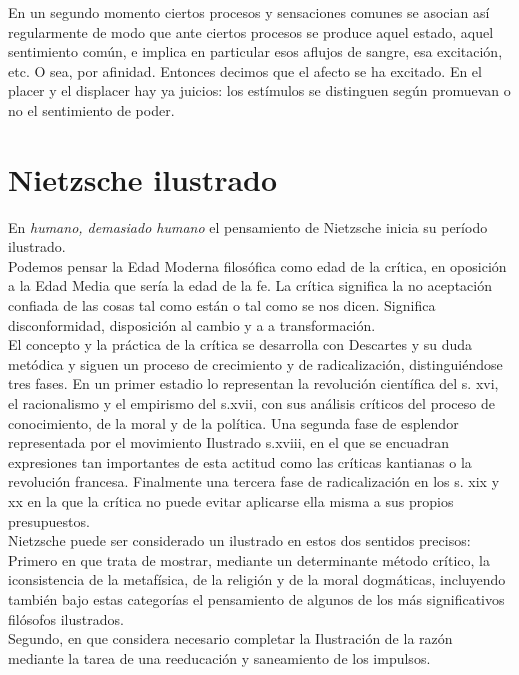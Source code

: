 \documentclass[a4paper, 10pt, twocolumn, spanish]{article}
\begin{document}
En un segundo momento ciertos procesos y sensaciones comunes se
asocian así regularmente de modo que ante ciertos procesos se produce
aquel estado, aquel sentimiento común, e implica en particular esos
aflujos de sangre, esa excitación, etc. O sea, por afinidad. Entonces
decimos que el afecto se ha excitado. En el placer y el displacer hay
ya juicios: los estímulos se distinguen según promuevan o no el
sentimiento de poder.

\section{Nietzsche ilustrado}
\label{sec:org2d4f695}
En \emph{humano, demasiado humano} el pensamiento de Nietzsche inicia su
período ilustrado.\\[0pt]

Podemos pensar la Edad Moderna filosófica como edad de la crítica, en
oposición a la Edad Media que sería la edad de la fe. La crítica
significa la no aceptación confiada de las cosas tal como están o tal
como se nos dicen. Significa disconformidad, disposición al cambio y a
a transformación.\\[0pt]

El concepto y la práctica de la crítica se desarrolla con Descartes y
su duda metódica y siguen un proceso de crecimiento y de
radicalización, distinguiéndose tres fases. En un primer estadio lo
representan la revolución científica del s. xvi, el racionalismo y el
empirismo del s.xvii, con sus análisis críticos del proceso de
conocimiento, de la moral y de la política. Una segunda fase de
esplendor representada por el movimiento Ilustrado s.xviii, en el que
se encuadran expresiones tan importantes de esta actitud como las
críticas kantianas o la revolución francesa. Finalmente una tercera
fase de radicalización en los s. xix y xx en la que la crítica no
puede evitar aplicarse ella misma a sus propios presupuestos.\\[0pt]

Nietzsche puede ser considerado un ilustrado en estos dos sentidos
precisos: Primero en que trata de mostrar, mediante un determinante
método crítico, la iconsistencia de la metafísica, de la religión y de
la moral dogmáticas, incluyendo también bajo estas categorías el
pensamiento de algunos de los más significativos filósofos
ilustrados.\\[0pt]
Segundo, en que considera necesario completar la Ilustración de la
razón mediante la tarea de una reeducación y saneamiento de los
impulsos.\\[0pt]
\end{document}
